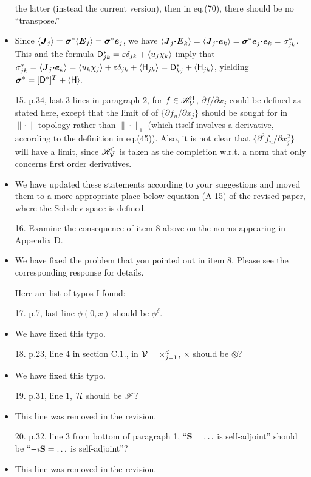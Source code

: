 \documentclass[amsa]{article}
\begin{document}
\begin{itemize}
  the latter (instead the current version), then in eq.(70), there
  should be no ``transpose.'' 
%
\item Since $\langle\boldsymbol{J}_j\rangle=\mbox{\boldmath${\sigma}$}^*\langle\boldsymbol{E}_j\rangle=\mbox{\boldmath${\sigma}$}^*\boldsymbol{e}_j$, we have
  $\langle\boldsymbol{J}_j\mbox{\boldmath${\cdot}$}\boldsymbol{E}_k\rangle=\langle\boldsymbol{J}_j\mbox{\boldmath${\cdot}$}\boldsymbol{e}_k\rangle=\mbox{\boldmath${\sigma}$}^*\boldsymbol{e}_j\mbox{\boldmath${\cdot}$}\boldsymbol{e}_k=\sigma^*_{jk}$.
  This and the formula $\mathsf{D}^*_{jk}=\varepsilon\delta_{jk}+\langle u_j\chi_k\rangle$ imply that
  $\sigma^*_{jk}=\langle\boldsymbol{J}_j\mbox{\boldmath${\cdot}$}\boldsymbol{e}_k\rangle=\langle u_k\chi_j\rangle+\varepsilon\delta_{jk}+\langle\mathsf{H}_{jk}\rangle
  =\mathsf{D}^*_{kj}+\langle\mathsf{H}_{jk}\rangle$, yielding $\mbox{\boldmath${\sigma}$}^*=[\mathsf{D}^*]^T+\langle\mathsf{H}\rangle$.
%
\item[15.] p.34, last 3 lines in paragraph 2, for $f\in\mathscr{H}^1_{\mathcal{V}}$, $\partial
  f/\partial x_j$ could be defined as stated here, except that the limit of
  of $\{\partial f_n/\partial x_j\}$ should be sought for in $\|\cdot\|$ topology rather
  than $\|\cdot\|_1$ (which itself involves a derivative, according to the
  definition in eq.(45)). Also, it is not clear that $\{\partial^2 f_n/\partial
  x_j^2\}$  will have a limit, since $\mathscr{H}^1_{\mathcal{V}}$ is taken as the
  completion w.r.t. a norm that only concerns first order
  derivatives.
%
\item We have updated these statements according to your suggestions
  and moved them to a more appropriate place below equation (A-15) of
  the revised paper, where the Sobolev space is defined.
%
\item[16.]  Examine the consequence of item 8 above on the norms
  appearing in Appendix D.
%
\item We have fixed the problem that you pointed out in item 8. Please
  see the corresponding response for details.

\noindent Here are list of typos I found:

%
\item[17.] p.7, last line $\phi(0,x)$ should be $\phi^\delta$.
%
\item We have fixed this typo.
%
\item[18.] p.23, line 4 in section C.1., in $\mathcal{V}=\times_{j=1}^d$, $\times$
  should be $\otimes$? 
%
\item We have fixed this typo.
%  
\item[19.] p.31, line 1, $\mathcal{H}$ should be $\mathscr{F}$?
%
\item This line was removed in the revision.
%
\item[20.] p.32, line 3 from bottom of paragraph 1, ``$\mathbf{S}=\ldots$ is
  self-adjoint'' should be ``$-\imath\mathbf{S}=\ldots$ is self-adjoint''?
%  
\item This line was removed in the revision.
%  
\end{itemize}
\end{document}
